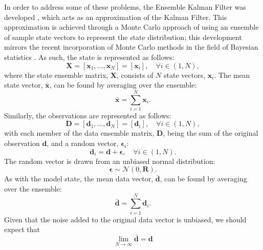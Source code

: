 In order to address some of these problems, the Ensemble Kalman Filter was
developed \citep{evensen2003ensemble, evensen2009ensemble}, which acts as an
approximation of the Kalman Filter.
This approximation is achieved through a Monte Carlo approach of using an
ensemble of sample state vectors to represent the state distribution; this
development mirrors the recent incorporation of Monte Carlo methods in the field
of Bayesian statistics \citep{wikle2007bayesian}.
As such, the state is represented as follows:
\begin{equation}
    \mathbf{X} = \left[ \mathbf{x}_1, \ldots, \mathbf{x}_N \right]
               = \left[ \mathbf{x}_i \right], \quad \forall i \in (1, N),
\end{equation}
where the state ensemble matrix, $\mathbf{X}$, consists of $N$ state vectors,
$\mathbf{x}_i$.
The mean state vector, $\bar{\mathbf{x}}$, can be found by averaging over the
ensemble:
\begin{equation}
    \bar{\mathbf{x}} = \sum_{i = 1}^{N} \mathbf{x}_i.
\end{equation}
Similarly, the observations are represented as follows:
\begin{equation}
    \mathbf{D} = \left[ \mathbf{d}_1, \ldots, \mathbf{d}_N \right]
               = \left[ \mathbf{d}_i \right], \quad \forall i \in (1, N),
\end{equation}
with each member of the data ensemble matrix, $\mathbf{D}$, being the sum of the
original observation $\mathbf{d}$, and a random vector, $\mathbf{\epsilon}_i$:
\begin{equation}
    \mathbf{d}_i = \mathbf{d} + \mathbf{\epsilon}, \quad
                   \forall i \in (1, N).
\end{equation}
The random vector is drawn from an unbiased normal distribution:
\begin{equation}
    \mathbf{\epsilon} \sim \mathcal{N} (0, \mathbf{R}).
\end{equation}
As with the model state, the mean data vector, $\bar{\mathbf{d}}$, can be found
by averaging over the ensemble:
\begin{equation}
    \bar{\mathbf{d}} = \sum_{i = 1}^{N} \mathbf{d}_i.
\end{equation}
Given that the noise added to the original data vector is unbiased, we should
expect that
\begin{equation}
    \lim_{N \to \infty} \bar{\mathbf{d}} = \mathbf{d}
\end{equation}

